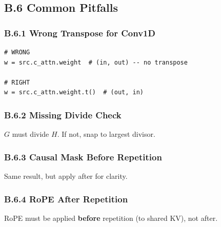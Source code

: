 \subsection{B.6 Common Pitfalls}

\subsubsection{B.6.1 Wrong Transpose for Conv1D}

\begin{lstlisting}
# WRONG
w = src.c_attn.weight  # (in, out) -- no transpose

# RIGHT
w = src.c_attn.weight.t()  # (out, in)
\end{lstlisting}

\subsubsection{B.6.2 Missing Divide Check}

$G$ must divide $H$. If not, snap to largest divisor.

\subsubsection{B.6.3 Causal Mask Before Repetition}

Same result, but apply after for clarity.

\subsubsection{B.6.4 RoPE After Repetition}

RoPE must be applied \textbf{before} repetition (to shared KV), not after.